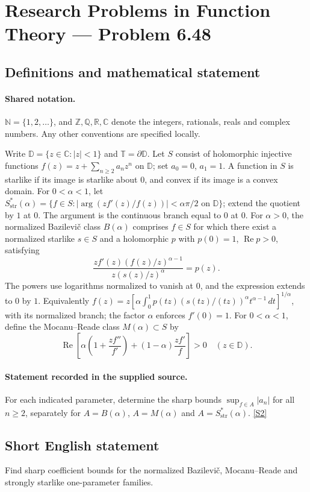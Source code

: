 \documentclass[11pt]{article}
\newcommand{\sref}[2]{\hyperlink{source:#1:#2}{[S#2]}}
\begin{document}
\section{Research Problems in Function Theory — Problem 6.48}\label{statement}

\subsection{Definitions and mathematical statement}

\paragraph{Shared notation.}$\mathbb N=\{1,2,\ldots\}$, and $\mathbb Z,\mathbb Q,\mathbb R,\mathbb C$ denote the integers, rationals, reals and complex numbers. Any other conventions are specified locally.


Write $\mathbb D=\{z\in\mathbb C:|z|<1\}$ and $\mathbb T=\partial\mathbb D$. Let $S$ consist of holomorphic injective functions $f(z)=z+\sum_{n\ge2}a_nz^n$ on $\mathbb D$; set $a_0=0$, $a_1=1$. A function in $S$ is starlike if its image is starlike about $0$, and convex if its image is a convex domain. For $0<\alpha<1$, let $S^*_{\mathrm{str}}(\alpha)=\{f\in S:|\arg(zf'(z)/f(z))|<\alpha\pi/2\text{ on }\mathbb D\}$; extend the quotient by $1$ at $0$. The argument is the continuous branch equal to $0$ at $0$. For $\alpha>0$, the normalized Bazilevi\v{c} class $B(\alpha)$ comprises $f\in S$ for which there exist a normalized starlike $s\in S$ and a holomorphic $p$ with $p(0)=1$, $\operatorname{Re}p>0$, satisfying
\[\frac{zf'(z)(f(z)/z)^{\alpha-1}}{z(s(z)/z)^\alpha}=p(z).\]
The powers use logarithms normalized to vanish at $0$, and the expression extends to $0$ by $1$. Equivalently $f(z)=z\left[\alpha\int_0^1p(tz)(s(tz)/(tz))^\alpha t^{\alpha-1}\,dt\right]^{1/\alpha}$, with its normalized branch; the factor $\alpha$ enforces $f'(0)=1$. For $0<\alpha<1$, define the Mocanu--Reade class $M(\alpha)\subset S$ by
\[\operatorname{Re}\left[\alpha\left(1+\frac{zf''}{f'}\right)+(1-\alpha)\frac{zf'}{f}\right]>0\quad(z\in\mathbb D).\]
\paragraph{Statement recorded in the supplied source.}
For each indicated parameter, determine the sharp bounds $\sup_{f\in A}|a_n|$ for all $n\ge2$, separately for $A=B(\alpha)$, $A=M(\alpha)$ and $A=S^*_{\mathrm{str}}(\alpha)$. \sref{statement}{2}
\subsection{Short English statement}
Find sharp coefficient bounds for the normalized Bazilevič, Mocanu–Reade and strongly starlike one-parameter families.
\end{document}
